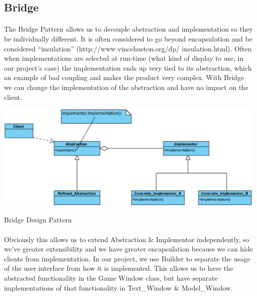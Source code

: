 \subsection{Bridge}	
	\vspace{3 mm}
	\begin{multicols}{2}
	\paragraph{}
		The Bridge Pattern allows us to decouple abstraction and implementation so they be individually different. It is often considered to go 
		beyond encapsulation and be considered “insulation” (http://www.vincehuston.org/dp/ insulation.html). Often when implementations are 
		selected at run-time (what kind of display to use, in our project’s case) the implementation ends up very tied to its abstraction, which an 
		example of bad coupling and makes the product very complex. With Bridge we can change the implementation of the abstraction and have no 
		impact on the client.
	\end{multicols}	
		\begin{figurehere}
			\centering
			\includegraphics[width=140mm]{figures/bridge.png}
			\caption{Bridge Design Pattern}
		\end{figurehere}
	\begin{multicols}{2}
	\paragraph{}
		\vspace{8 mm}
		Obviously this allows us to extend Abstraction \& Implementor independently, so we’ve greater extensibility and we have greater encapsulation 
		because we can hide clients from implementation.
		\newline
		\newline
		In our project, we use Builder to separate the usage of the user interface from how it is implemented. This allows us to have the 
		abstracted functionality in the Game Window class, but have separate implementations of that functionality in Text\_Window \& 
		Model\_Window.
		\newline
		\newline
	\end{multicols}	
	

